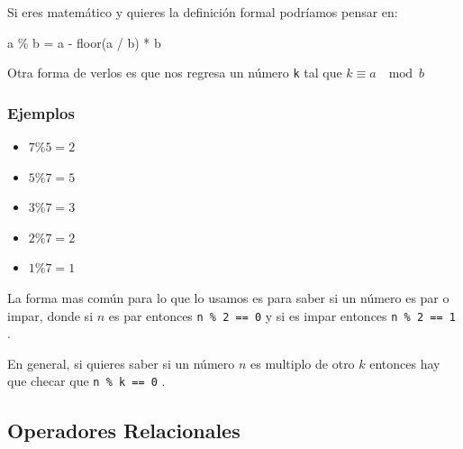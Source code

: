\documentclass[12pt, fleqn]{report}                             %
\def \Eq {equation}                                             %
\newenvironment{MultiLineEquation*}[1]                          %
        {\begin{\Eq*}\begin{alignedat}{#1}}                         %
        {\end{alignedat}\end{\Eq*}}                                 %
\theoremstyle{break}                                            %
\newcommand{\textCode}[1]  { \texttt{#1} }                      %
\begin{document}
                    Si eres matemático y quieres la definición formal podríamos pensar en:

                    \begin{MultiLineEquation*}{3}
                        a \% b = a - floor(a / b) \; * \; b
                    \end{MultiLineEquation*}

                    Otra forma de verlos es que nos regresa un número \textCode{k}
                    tal que $k \equiv a \; \mod b$

                \subsubsection{Ejemplos}
                
                    \begin{itemize}
                        \item $7 \% 5 = 2$
                        \item $5 \% 7 = 5$
                        \item $3 \% 7 = 3$
                        \item $2 \% 7 = 2$
                        \item $1 \% 7 = 1$
                    \end{itemize}

                    La forma mas común para lo que lo usamos
                    es para saber si un número es par o impar, donde
                    si $n$ es par entonces \textCode{n \% 2 == 0} y si es impar
                    entonces \textCode{n \% 2 == 1}.

                    En general, si quieres saber si un número $n$ es multiplo de 
                    otro $k$ entonces hay que checar que \textCode{n \% k == 0}.

            \clearpage
            \subsection{Operadores Relacionales}
\end{document}
